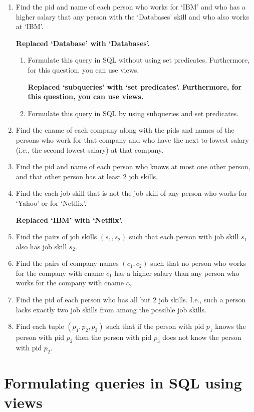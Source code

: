 \begin{enumerate}
\newpage
\item   Find the pid and name of each person who works for `IBM' and who has a higher salary
that any person with the `Databases' skill and who also works at `IBM'.

{\bf Replaced `Database' with `Databases'.}
\begin{enumerate}
\item   Formulate this query in SQL without using set predicates.
Furthermore, for this question, you can use views.

{\bf Replaced `subqueries' with `set predicates'. Furthermore, for this question, you can use views.}
\item   Formulate this query in SQL by using subqueries and
set predicates.
\end{enumerate}

\item  Find the cname of each company along with the pids and names
of the persons who work for that company and who have the next to lowest salary (i.e., the second lowest salary)
at that company.

\item Find the pid and name of each person who knows at most one other person, and that other person has at least
2 job skills.

\item Find the each job skill that is not the job skill of any person who works for `Yahoo' or for `Netflix'.

{\bf Replaced `IBM' with `Netflix'.}
\item Find the pairs of job skills $(s_1,s_2)$ such that each person with job skill $s_1$ also has job skill $s_2$.

\item Find the pairs of company names $(c_1,c_2)$ such that no person who works for the
company with cname $c_1$ has a higher salary than any person who works for the
company  with cname $c_2$.

\item Find the pid of each person who has all but 2 job skills.  I.e., such a person lacks exactly two job skills
from among the possible job skills. 

\item  Find each tuple $(p_1,p_2, p_3)$ 
such that if the person with pid $p_1$ knows the person with pid $p_2$ then the person
with pid $p_3$ does not know the person with pid $p_2$. 
\end{enumerate}
\newpage
\section{Formulating queries in SQL using views}

